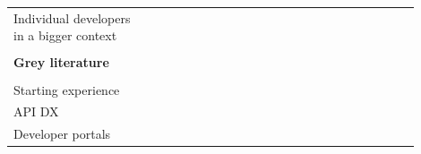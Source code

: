 \documentclass[english, 12pt, a4paper, sci, utf8, a-1b, online]{aaltothesis}
\begin{document}
\begin{center}
\begin{longtable}{p{0.3\linewidth}p{0.6\linewidth}}
    Individual developers in a bigger context  & \textcite{entering-an-ecosystem} \newline \textcite{fagerholm2014examining}                                                                                                                                                                                                                           \\
                                               &                                                                                                                                                                                                                                                                                                       \\
    \textbf{Grey literature}                                                                                                                                                                                                                                                                                                                           \\
    \hline                                                                                                                                                                                                                                                                                                                                             \\
    Starting experience                        & \textcite{what-is-developer-experience-everydeveloper}                                                                                                                                                                                                                                                \\
    API DX                                     & \textcite{great-dx-and-the-people-who-make-them}                                                                                                                                                                                                                                                      \\
    Developer portals                          & \textcite{apis-for-humans-the-rise-of-developer-experience} \newline \textcite{4-apis-doing-developer-experience-really-well} \newline \textcite{what-is-api-developer-experience-and-why-it-matters}                                                                                                 \\

\end{longtable}
\end{center}
\end{document}
